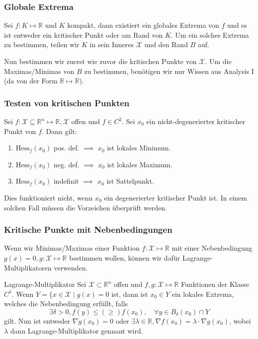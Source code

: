 \documentclass[a4paper,10pt]{article}
\def\R{\mathbb{R}}
\def\X{\mathcal{X}}
\begin{document}
\subsubsection*{Globale Extrema}
Sei \(f: K \mapsto \R\) und \(K\) kompakt, dann existiert ein globales Extrema von \(f\) und es ist entweder ein kritischer Punkt oder am Rand von \(K\). Um ein solches Extrema zu bestimmen, teilen wir \(K\) in sein Inneres \(\X\) und den Rand \(B\) auf. 

Nun bestimmen wir zuerst wie zuvor die kritischen Punkte von \(\X\). Um die Maximas/Minimas von \(B\) zu bestimmen, benötigen wir nur Wissen aus Analysis I (da von der Form \(\R \mapsto \R\)).
\subsubsection*{Testen von kritischen Punkten}
Sei \(f: \X \subseteq \R^n \mapsto \R, \X\) offen und \(f\in C^2\). Sei \(x_0\) ein nicht-degenerierter kritischer Punkt von \(f\). Dann gilt:
\begin{enumerate}
  \item $\text{Hess}_f(x_0)$ pos. def. \(\implies\) $x_0$ ist lokales Minimum.
  \item $\text{Hess}_f(x_0)$ neg. def. \(\implies\) $x_0$ ist lokales Maximum.
  \item $\text{Hess}_f(x_0)$ indefinit \(\implies\) $x_0$ ist Sattelpunkt.
\end{enumerate}
Dies funktioniert nicht, wenn \(x_0\) ein degenerierter kritischer Punkt ist. In einem solchen Fall müssen die Vorzeichen überprüft werden.
\subsubsection*{Kritische Punkte mit Nebenbedingungen}
Wenn wir Minimas/Maximas einer Funktion \(f: \X \mapsto \R\) mit einer Nebenbedingung \(g(x) = 0, g: \X \mapsto \R\) bestimmen wollen, können wir dafür Lagrange-Multiplikatoren verwenden.
\begin{subbox}{Lagrange-Multiplikator}
  Sei \(\X \subset \R^n\) offen und \(f,g: \X \mapsto \R\) Funktionen der Klasse \(C^1\). Wenn \(Y = \{x \in \X \mid g(x) = 0\) ist, dann ist \(x_0 \in Y\) ein lokales Extrema, welches die Nebenbedingung erfüllt, falls 
  \[\exists \delta > 0, f(y) \le (\ge) f(x_0), \quad \forall y \in B_\delta(x_0) \cap Y\]
  gilt. Nun ist entweder \(\nabla g(x_0) = 0\) oder \(\exists \lambda \in \R, \nabla f(x_0) = \lambda \cdot \nabla g(x_0)\), wobei \(\lambda\) dann Lagrange-Multiplikator gennant wird.
\end{subbox}
\end{document}
